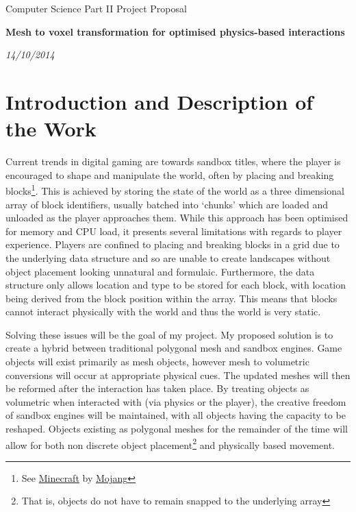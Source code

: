 \thispagestyle{empty}

\medskip
{}
\medskip
{}

\vfil

\centerline{\large Computer Science Part II Project Proposal}
\vspace{0.4in}
\begin{center}
\Large\bf Mesh to voxel transformation for optimised physics-based interactions
\end{center}
\vspace{0.3in}
\centerline{\large \emph{14/10/2014}}

\vfil

\eject

\section*{Introduction and Description of the Work}

Current trends in digital gaming are towards sandbox titles, where the player is encouraged to shape and manipulate the world, often by placing and breaking blocks\footnote{See \href{https://minecraft.net/}{Minecraft} by \href{http://mojang.com/}{Mojang}}. This is achieved by storing the state of the world as a three dimensional array of block identifiers, usually batched into `chunks' which are loaded and unloaded as the player approaches them. While this approach has been optimised for memory and CPU load, it presents several limitations with regards to player experience. Players are confined to placing and breaking blocks in a grid due to the underlying data structure and so are unable to create landscapes without object placement looking unnatural and formulaic. Furthermore, the data structure only allows location and type to be stored for each block, with location being derived from the block position within the array. This means that blocks cannot interact physically with the world and thus the world is very static.

Solving these issues will be the goal of my project. My proposed solution is to create a hybrid between traditional polygonal mesh and sandbox engines. Game objects will exist primarily as mesh objects, however mesh to volumetric conversions will occur at appropriate physical cues. The updated meshes will then be reformed after the interaction has taken place. By treating objects as volumetric when interacted with (via physics or the player), the creative freedom of sandbox engines will be maintained, with all objects having the capacity to be reshaped. Objects existing as polygonal meshes for the remainder of the time will allow for both non discrete object placement\footnote{That is, objects do not have to remain snapped to the underlying array} and physically based movement.

